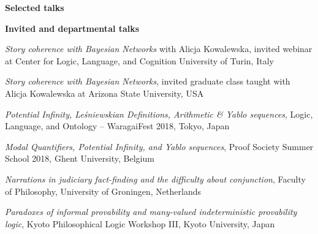 \documentclass[10pt, a4paper]{article}
\newcommand{\years}[1]{\marginnote{\normalsize #1}}
\begin{document}





\vspace{0.5mm}

\years{2011}




\vspace{2mm}

\pagebreak 


\large {\sc \textbf{Selected talks}}\normalsize 

\setlength{\emergencystretch}{3em}



\vspace{1mm}


 {\sc \textbf{Invited and departmental talks}}\normalsize 

\noindent

\vspace{1.5mm}

\years{2021}  

\emph{Story coherence with Bayesian Networks} with Alicja Kowalewska, invited webinar at Center for Logic, Language, and Cognition University of Turin, Italy


\emph{Story coherence with Bayesian Networks}, invited graduate class taught with Alicja Kowalewska at Arizona State University, USA



\years{2018} 

\emph{Potential Infinity, Le\' sniewskian Definitions, Arithmetic \& Yablo sequences}, Logic, Language, and Ontology -- WaragaiFest 2018, Tokyo, Japan 

\vspace{0.5mm}


\emph{Modal Quantifiers, Potential Infinity, and Yablo sequences}, Proof Society Summer School 2018, Ghent University, Belgium

\vspace{0.5mm}

\years{2017} \emph{Narrations in judiciary fact-finding
and the difficulty about conjunction}, Faculty of Philosophy, University of Groningen, Netherlands

\vspace{0.5mm}

\emph{Paradoxes of informal provability and many-valued indeterministic provability logic}, Kyoto Philosophical Logic Workshop III, Kyoto University, Japan
\end{document}
